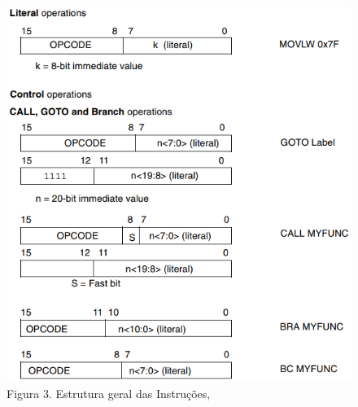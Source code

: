\documentclass[12pt]{article}
\begin{document}
\begin{figure}[h]
	\centering
	\includegraphics[width=.5\textwidth]{figs/instructions-2.png}
	\caption{Figura 3. Estrutura geral das Instruções, }
\end{figure}
\clearpage


\end{document}
